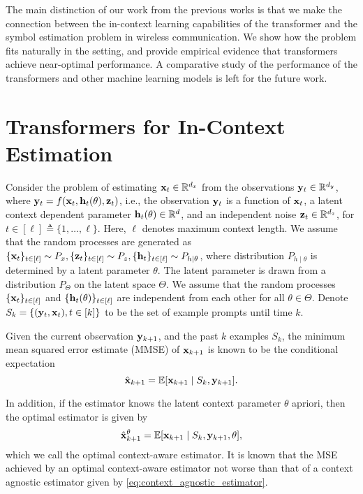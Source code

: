 \documentclass[journal,letterpaper,onecolumn]{IEEEtran}
\begin{document}
 
 The main distinction of our work from the previous works is that we make the connection between the in-context learning capabilities of the transformer and the symbol estimation problem in wireless communication. We show how the problem fits naturally in the setting, and provide empirical evidence that transformers achieve near-optimal performance. A comparative study of the performance of the transformers and other machine learning models is left for the future work.


\section{Transformers for In-Context Estimation}
\label{in_context_estimation}
Consider the problem of estimating ${\mathbf{x}}_t \in{\mathbb{R}}^{d_x}$ from the observations ${\mathbf{y}}_t \in {\mathbb{R}}^{d_y}$, where ${\mathbf{y}}_t = f({\mathbf{x}}_t, {\mathbf{h}}_t(\theta), {\mathbf{z}}_t)$, i.e., the observation ${\mathbf{y}}_t$ is a function of ${\mathbf{x}}_t$, a latent context dependent parameter ${\mathbf{h}}_t(\theta) \in{\mathbb{R}}^d$, and an independent noise ${\mathbf{z}}_t \in {\mathbb{R}}^{d_z}$, for $t \in [\ell] \triangleq \{1, \dots, \ell\}$. Here, $\ell$ denotes maximum context length. We assume that the random processes are generated as $\{{\mathbf{x}}_t\}_{t\in[\ell]} \sim P_x, \{{\mathbf{z}}_t\}_{t\in[\ell]} \sim P_z, \{{\mathbf{h}}_{t}\}_{t\in[\ell]} \sim P_{h\mid\theta}$, where distribution $P_{h\mid \theta}$ is determined by a latent parameter $\theta$. The latent parameter is drawn from a distribution $P_\Theta$ on the latent space $\Theta$. We assume that the random processes $\{{\mathbf{x}}_t\}_{t\in[\ell]}$ and $\{{\mathbf{h}}_t(\theta)\}_{t\in[\ell]}$ are independent from each other for all $\theta \in \Theta$. Denote $S_k = \{({\mathbf{y}}_t, {\mathbf{x}}_t), t\in[k]\}$ to be the set of example prompts until time $k$.

Given the current observation ${\mathbf{y}}_{k+1}$, and the past $k$ examples $S_k$, the minimum mean squared error estimate (MMSE) of ${\mathbf{x}}_{k+1}$ is known to be the conditional expectation
\begin{equation}
\label{eq:context_agnostic_estimator}
    \hat{{\mathbf{x}}}_{k+1} = \mathbb{E}[ {\mathbf{x}}_{k+1} \mid S_k, {\mathbf{y}}_{k+1}].
\end{equation}

In addition, if the estimator knows the latent context parameter $\theta$ apriori, then the optimal estimator is given by
\begin{equation}
\label{eq:in_context_estimator}
    \hat{{\mathbf{x}}}_{k+1}^\theta = \mathbb{E}[ {\mathbf{x}}_{k+1} \mid S_k, {\mathbf{y}}_{k+1}, \theta],
\end{equation}
which we call the optimal context-aware estimator. It is known that the MSE achieved by an optimal context-aware estimator not worse than that of a context agnostic estimator given by \ref{eq:context_agnostic_estimator}.
\end{document}

